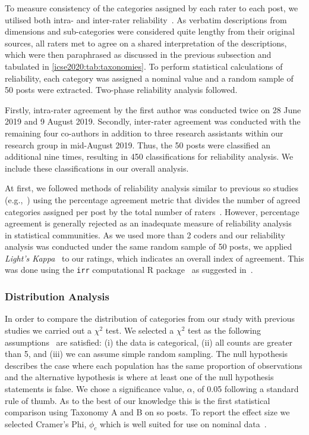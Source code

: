 To measure consistency of the categories assigned by each rater to each post, we utilised both intra- and inter-rater reliability~\citep{McHugh:2012up}. As verbatim descriptions from dimensions and sub-categories were considered quite lengthy from their original sources, all raters met to agree on a shared interpretation of the descriptions, which were then paraphrased as discussed in the previous subsection and tabulated in \cref{icse2020:tab:taxonomies}. To perform statistical calculations of reliability, each category was assigned a nominal value and a random sample of 50 posts were extracted. Two-phase reliability analysis followed.

Firstly, intra-rater agreement by the first author was conducted twice on 28 June 2019 and 9 August 2019. Secondly, inter-rater agreement was conducted with the remaining four co-authors in addition to three research assistants within our research group in mid-August 2019. Thus, the 50 posts were classified an additional nine times, resulting in 450 classifications for reliability analysis. We include these classifications in our overall analysis.

At first, we followed methods of reliability analysis similar to previous \gls{so} studies (e.g.,~\citep{Tahir:2018ks}) using the percentage agreement metric that divides the number of agreed categories assigned per post by the total number of raters~\citep{McHugh:2012up}. However, percentage agreement is generally rejected as an inadequate measure of reliability analysis~\citep{Cohen:1960tf,Krippendorff:2018tda,Hallgren:2012kt} in statistical communities. As we used more than 2 coders and our reliability analysis was conducted under the same random sample of 50 posts, we applied \textit{Light's Kappa}~\citep{Light:1971vz} to our ratings, which indicates an overall index of agreement. This was done using the \texttt{irr} computational R package~\citep{Gamer:tj} as suggested in~\citep{Hallgren:2012kt}.

\subsubsection{Distribution Analysis}

In order to compare the distribution of categories from our study with previous studies we carried out a \(\chi^2\) test. We selected a \(\chi^2\) test as the following assumptions~\citep{Sheskin:2003tx} are satisfied: (i) the data is categorical, (ii) all counts are greater than 5, and (iii) we can assume simple random sampling. The null hypothesis describes the case where each population has the same proportion of observations and the alternative hypothesis is where at least one of the null hypothesis statements is false. We chose a significance value, \(\alpha\), of 0.05 following a standard rule of thumb. As to the best of our knowledge this is the first statistical comparison using Taxonomy A and B on \gls{so} posts. To report the effect size we selected Cramer's Phi, \(\phi_c\) which is well suited for use on nominal data~\citep{Sheskin:2003tx}.


